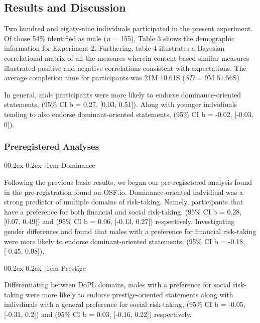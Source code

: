 \documentclass[
  donotrepeattitle,doc, 12pt, a4paper,floatsintext]{apa7}
\makeatletter
\let\oldparagraph\paragraph
\renewcommand{\paragraph}[1]{\oldparagraph{#1}\mbox{}}
\renewcommand{\paragraph}{\@startsection{paragraph}{4}{\parindent}%
  {0\baselineskip \@plus 0.2ex \@minus 0.2ex}%
  {-1em}%
  {\normalfont\normalsize\bfseries\itshape\typesectitle}}
\makeatother
\begin{document}
\hypertarget{results-and-discussion}{%
\subsection{Results and Discussion}\label{results-and-discussion}}

Two hundred and eighty-nine individuals participated in the present experiment. Of those 54\% identified as male (\emph{n} = 155). Table 3 shows the demographic information for Experiment 2. Furthering, table 4 illustrates a Bayesian correlational matrix of all the measures wherein content-based similar measures illustrated positive and negative correlations consistent with expectations. The average completion time for participants was 21M 10.61S (\emph{SD} = 9M 51.56S)

In general, male participants were more likely to endorse dominance-oriented statements, (95\% CI b = 0.27, {[}0.03, 0.51{]}). Along with younger indvidiuals tending to also endorse dominant-oriented statements, (95\% CI b = -0.02, {[}-0.03, 0{]}).

\hypertarget{preregistered-analyses-1}{%
\subsubsection{Preregistered Analyses}\label{preregistered-analyses-1}}

\hypertarget{dominance-1}{%
\paragraph{Dominance}\label{dominance-1}}

Following the previous basic results, we began our pre-regisetered analysis found in the pre-registration found on OSF.io. Dominance-oriented indvidiual was a strong predictor of multiple domains of risk-taking. Namely, participants that have a preference for both financial and social risk-taking, (95\% CI b = 0.28, {[}0.07, 0.49{]}) and (95\% CI b = 0.06, {[}-0.13, 0.27{]}) respectively. Investigating gender differences and found that males with a preference for financial risk-taking were more likely to endorse dominant-oriented statements, (95\% CI b = -0.18, {[}-0.45, 0.08{]}).

\hypertarget{prestige-1}{%
\paragraph{Prestige}\label{prestige-1}}

Differentiating between DoPL domains, males with a preference for social risk-taking were more likely to endorse prestige-oriented statements along with indivdiuals with a general preference for social risk-taking, (95\% CI b = -0.05, {[}-0.31, 0.2{]}) and (95\% CI b = 0.03, {[}-0.16, 0.22{]}) respectively.
\end{document}
